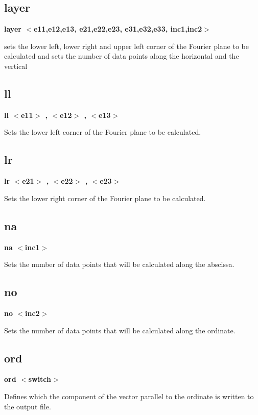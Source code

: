 \subsection*{layer}
{\bf layer $ <$e11,e12,e13, e21,e22,e23, e31,e32,e33, inc1,inc2$> $ \par }
\par
\vspace{3pt}
sets the lower left, lower right and upper left corner of the 
Fourier plane to be calculated and sets the number of data 
points along the horizontal and the vertical 
\subsection*{ll}
{\bf ll $ <$e11$> $ , $ <$e12$> $ , $ <$e13$> $ \par }
\par
\vspace{3pt}
Sets the lower left corner of the Fourier plane to be calculated. 
\subsection*{lr}
{\bf lr $ <$e21$> $ , $ <$e22$> $ , $ <$e23$> $ \par }
\par
\vspace{3pt}
Sets the lower right corner of the Fourier plane to be calculated. 
\subsection*{na}
{\bf na $ <$inc1$> $ \par }
\par
\vspace{3pt}
Sets the number of data points that will be calculated along the 
abscissa. 
\subsection*{no}
{\bf no $ <$inc2$> $ \par }
\par
\vspace{3pt}
Sets the number of data points that will be calculated along the 
ordinate. 
\subsection*{ord}
{\bf ord $ <$switch$> $ \par }
\par
\vspace{3pt}
Defines which the component of the vector parallel to the ordinate 
is written to the output file. 
